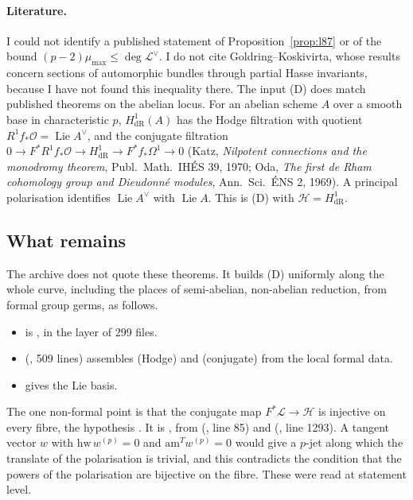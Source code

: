 \documentclass[11pt]{article}
\theoremstyle{remark}
\begin{document}
\paragraph{Literature.} I could not identify a published statement of Proposition~\ref{prop:l87} or of the bound $(p-2)\mu_{\max}\le\deg\mathcal L^\vee$. I do not cite Goldring--Koskivirta, whose results concern sections of automorphic bundles through partial Hasse invariants, because I have not found this inequality there. The input (D) does match published theorems on the abelian locus. For an abelian scheme $A$ over a smooth base in characteristic $p$, $H^1_{\mathrm{dR}}(A)$ has the Hodge filtration with quotient $R^1f_*\mathcal O=\operatorname{Lie}A^\vee$, and the conjugate filtration $0\to F^*R^1f_*\mathcal O\to H^1_{\mathrm{dR}}\to F^*f_*\Omega^1\to0$ (Katz, \emph{Nilpotent connections and the monodromy theorem}, Publ.\ Math.\ IH\'ES 39, 1970; Oda, \emph{The first de Rham cohomology group and Dieudonn\'e modules}, Ann.\ Sci.\ \'ENS 2, 1969). A principal polarisation identifies $\operatorname{Lie}A^\vee$ with $\operatorname{Lie}A$. This is (D) with $\mathcal H=H^1_{\mathrm{dR}}$.

\subsection{What remains}

The archive does not quote these theorems. It builds (D) uniformly along the whole curve, including the places of semi-abelian, non-abelian reduction, from formal group germs, as follows.
\begin{itemize}[nosep]
\item {} is , in the layer  of 299 files.
\item {} (, 509 lines) assembles (Hodge) and (conjugate) from the local formal data.
\item {} gives the Lie basis.
\end{itemize}
The one non-formal point is that the conjugate map $F^*\mathcal L\to\mathcal H$ is injective on every fibre, the hypothesis . It is , from  (, line 85) and  (, line 1293). A tangent vector $w$ with $\mathrm{hw}\,w^{(p)}=0$ and $\mathrm{am}^Tw^{(p)}=0$ would give a $p$-jet along which the translate of the polarisation is trivial, and this contradicts the condition that the powers of the polarisation are bijective on the fibre. These were read at statement level.
\end{document}
